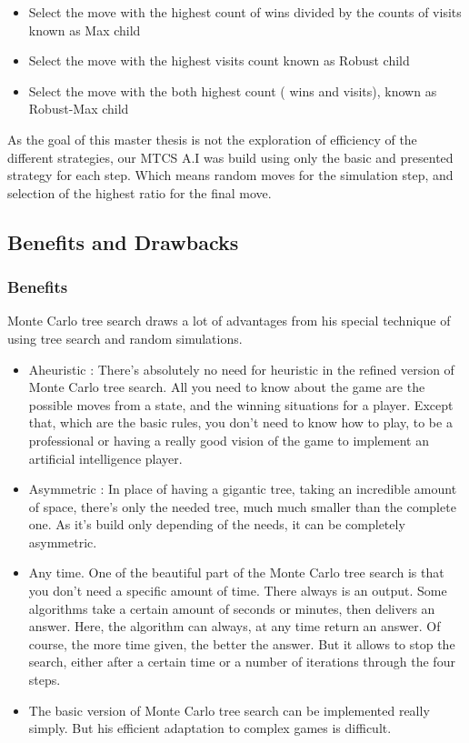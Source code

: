 \begin{itemize}
\item Select the move with the highest count of wins divided by the counts of visits known as Max child
\item Select the move with the highest visits count known as Robust child
\item Select the move with the both highest count ( wins and visits), known as Robust-Max child
\end{itemize}

As the goal of this master thesis is not the exploration of efficiency of the different strategies, our MTCS A.I was build using only the basic and presented strategy for each step. Which means random moves for the simulation step, and selection of the highest ratio for the final move. 
\subsection{Benefits and Drawbacks}

\subsubsection{Benefits}

Monte Carlo tree search draws a lot of advantages from his special technique of using tree search and random simulations. 
\begin{itemize}
\item Aheuristic : There's absolutely no need for heuristic in the refined version of Monte Carlo tree search. All you need to know about the game are the possible moves from a state, and the winning situations for a player. Except that, which are the basic rules, you don't need to know how to play, to be a professional or having a really good vision of  the game to implement an artificial intelligence player.
\item Asymmetric : In place of having a gigantic tree, taking an incredible amount of space, there's only the needed tree, much much smaller than the complete one. As it's build only depending of the needs, it can be completely asymmetric. 
\item Any time. One of the beautiful part of the Monte Carlo tree search is that you don't need a specific amount of time. There always is an output. Some algorithms take a certain amount of seconds or minutes, then delivers an answer. Here, the algorithm can always, at any time return an answer. Of course, the more time given, the better the answer. But it allows to stop the search, either after a certain time or a number of iterations through the four steps. 
\item The basic version of Monte Carlo tree search can be implemented really simply. But his efficient adaptation to complex games is difficult. 
\end{itemize}

